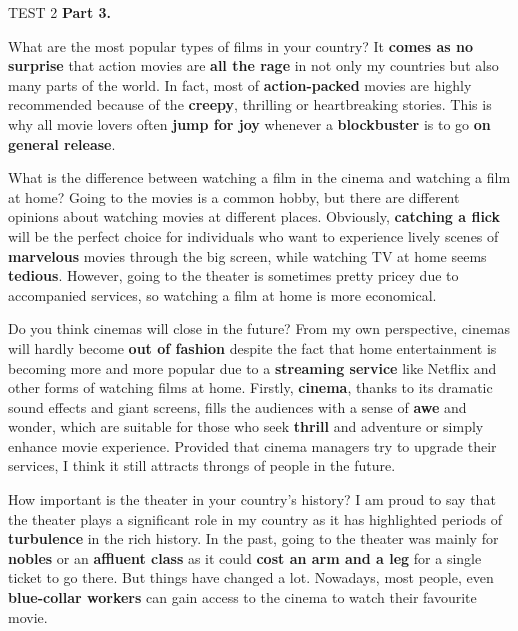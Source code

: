\begin{glossarymc}[Cambridge 12]
\begin{test}{TEST 2}
    \noindent
    \textbf{Part 3.}
    \begin{qa}{What are the most popular types of films in your country?}
    It \textbf{comes as no surprise} that action movies are \textbf{all the rage} in not only my countries but also many parts of the world. In fact, most of \textbf{action-packed} movies are highly recommended because of the \textbf{creepy}, thrilling or heartbreaking stories. This is why all movie lovers often \textbf{jump for joy} whenever a \textbf{blockbuster} is to go \textbf{on general release}.
    \end{qa}

    \begin{qa}{What is the difference between watching a film in the cinema and watching a film at home?}
    Going to the movies is a common hobby, but there are different opinions about watching movies at different places. Obviously, \textbf{catching a flick} will be the perfect choice for individuals who want to experience lively scenes of \textbf{marvelous} movies through the big screen, while watching TV at home seems \textbf{tedious}. However, going to the theater is sometimes pretty pricey due to accompanied services, so watching a film at home is more economical.
    \end{qa}

    \begin{qa}{Do you think cinemas will close in the future?}
    From my own perspective, cinemas will hardly become \textbf{out of fashion} despite the fact that home entertainment is becoming more and more popular due to a \textbf{streaming service} like Netflix and other forms of watching films at home. Firstly, \textbf{cinema}, thanks to its dramatic sound effects and giant screens, fills the audiences with a sense of \textbf{awe} and wonder, which are suitable for those who seek \textbf{thrill} and adventure or simply enhance movie experience. Provided that cinema managers try to upgrade their services, I think it still attracts throngs of people in the future.
    \end{qa}

    \begin{qa}{How important is the theater in your country's history?}
    I am proud to say that the theater plays a significant role in my country as it has highlighted periods of \textbf{turbulence} in the rich history. In the past, going to the theater was mainly for \textbf{nobles} or an \textbf{affluent class} as it could \textbf{cost an arm and a leg} for a single ticket to go there. But things have changed a lot. Nowadays, most people, even \textbf{blue-collar workers} can gain access to the cinema to watch their favourite movie.
    \end{qa}


\end{test}
\end{glossarymc}
